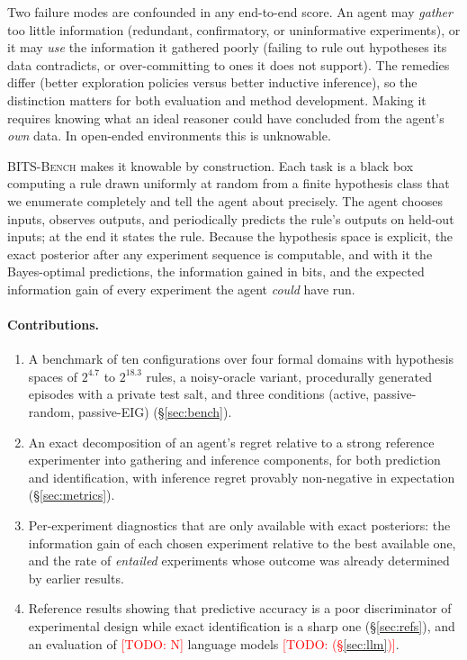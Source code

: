 \documentclass[11pt]{article}
\newcommand{\todo}[1]{\textcolor{red}{[TODO: #1]}}
\newcommand{\bench}{\textsc{BITS-Bench}}
\begin{document}
Two failure modes are confounded in any end-to-end score. An agent may \emph{gather} too little
information (redundant, confirmatory, or uninformative experiments), or it may \emph{use} the
information it gathered poorly (failing to rule out hypotheses its data contradicts, or over-committing
to ones it does not support). The remedies differ (better exploration policies versus better
inductive inference), so the distinction matters for both evaluation and method development. Making it
requires knowing what an ideal reasoner could have concluded from the agent's \emph{own} data. In
open-ended environments this is unknowable.

\bench{} makes it knowable by construction. Each task is a black box computing a rule drawn uniformly at
random from a finite hypothesis class that we enumerate completely and tell the agent about precisely.
The agent chooses inputs, observes outputs, and periodically predicts the rule's outputs on held-out
inputs; at the end it states the rule. Because the hypothesis space is explicit, the exact posterior
after any experiment sequence is computable, and with it the Bayes-optimal predictions, the information
gained in bits, and the expected information gain of every experiment the agent \emph{could} have run.

\paragraph{Contributions.}
\begin{enumerate}[leftmargin=*,itemsep=2pt]
\item A benchmark of ten configurations over four formal domains with hypothesis spaces of $2^{4.7}$ to
$2^{18.3}$ rules, a noisy-oracle variant, procedurally generated episodes with a private test salt, and
three conditions (active, passive-random, passive-EIG) (\S\ref{sec:bench}).
\item An exact decomposition of an agent's regret relative to a strong reference experimenter into
gathering and inference components, for both prediction and identification, with inference regret
provably non-negative in expectation (\S\ref{sec:metrics}).
\item Per-experiment diagnostics that are only available with exact posteriors: the information gain of
each chosen experiment relative to the best available one, and the rate of \emph{entailed}
experiments whose outcome was already determined by earlier results.
\item Reference results showing that predictive accuracy is a poor discriminator of experimental
design while exact identification is a sharp one (\S\ref{sec:refs}), and an evaluation of
\todo{N} language models \todo{(\S\ref{sec:llm})}.
\end{enumerate}
\end{document}
